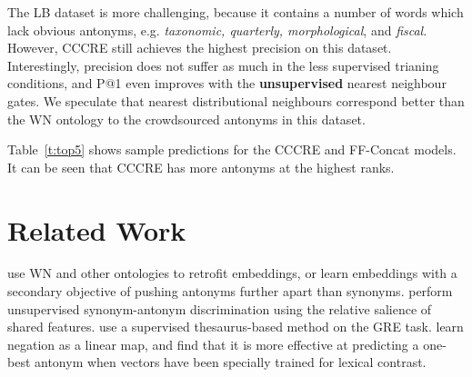\documentclass[11pt]{article}
\begin{document}
The LB dataset is more challenging, because it contains a number of words which lack obvious antonyms, e.g. {\it taxonomic, quarterly, morphological}, and {\it fiscal}. However, CCCRE still achieves the highest precision on this dataset. Interestingly, precision does not suffer as much in the less supervised trianing conditions, and P@1 even improves with the {\bf unsupervised} nearest neighbour gates. We speculate that nearest distributional neighbours correspond better than the WN ontology to the crowdsourced antonyms in this dataset.

Table~\ref{t:top5} shows sample predictions for the CCCRE and FF-Concat models. It can be seen that CCCRE has more antonyms at the highest ranks.




\section{Related Work}

\citet{pham:15,nguyen:16,mrksic:16} use WN and other ontologies to retrofit embeddings, or learn
embeddings with a secondary objective of pushing antonyms further apart than synonyms.
\citet{santus:14a,santus:14b,santus:15} perform unsupervised synonym-antonym
discrimination using the relative salience of shared features. 
\citet{mohammad:13} use a supervised
thesaurus-based method 
on the GRE task.
\citet{pham:15} learn negation as a linear map, and find that it is more effective at predicting a one-best antonym when vectors have been specially trained for lexical contrast.
\end{document}
